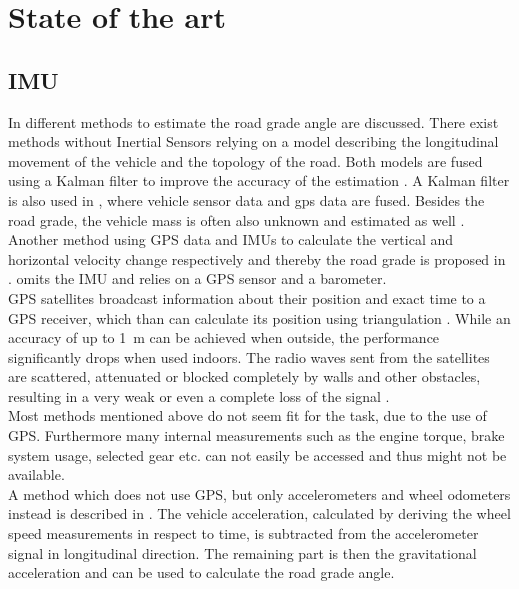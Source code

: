 \chapter{State of the art}
\label{ch:StateOfTheArt}




\section{IMU}
In \cite{Jauch2018} different methods to estimate the road grade angle are discussed.
There exist methods without Inertial Sensors relying on a model describing the longitudinal movement of the vehicle and the topology of the road.
Both models are fused using a Kalman filter to improve the accuracy of the estimation \cite{SAHLHOLM200755}.
A Kalman filter is also used in \cite{Sahlholm2010}, where vehicle sensor data and \gls{gps} data are fused.
Besides the road grade, the vehicle mass is often also unknown and estimated as well \cite{Sahlholm2010,Maleej2015}.
Another method using GPS data and IMUs to calculate the vertical and horizontal velocity change respectively and thereby the road grade is proposed in \cite{Ryu2004}.
\cite{YazdaniBoroujeni2014} omits the IMU and relies on a GPS sensor and a barometer.\\
GPS satellites broadcast information about their position and exact time to a GPS receiver, which than can calculate its position using triangulation \cite{Koyuncu2010}.
While an accuracy of up to \SI{1}{\metre} can be achieved when outside, the performance significantly drops when used indoors.
The radio waves sent from the satellites are scattered, attenuated or blocked completely by walls and other obstacles, resulting in a very weak or even a complete loss of the signal \cite{Ozdenizci2015}.\\
Most methods mentioned above do not seem fit for the task, due to the use of GPS.
Furthermore many internal measurements such as the engine torque, brake system usage, selected gear etc. can not easily be accessed and thus might not be available.\\
A method which does not use GPS, but only accelerometers and wheel odometers instead is described in \cite{Nilsson2012}.
The vehicle acceleration, calculated by deriving the wheel speed measurements in respect to time, is subtracted from the accelerometer signal in longitudinal direction.
The remaining part is then the gravitational acceleration and can be used to calculate the road grade angle.
